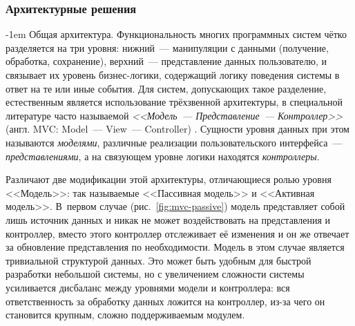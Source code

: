 \documentclass[a4paper, 14pt, titlepage]{extarticle}
\makeatletter
\newcommand{\eng}[1]{\foreignlanguage{english}{#1}}
\newcommand{\term}[1]{\emph{#1}}
\renewcommand{\paragraph}{%
    \@startsection{paragraph}{4}%
    {\parindent}{\z@}{-1em}%
    {\normalfont\normalsize\bfseries}%
  }
\makeatother
\begin{document}
  \subsubsection{Архитектурные решения}

  \paragraph{Общая архитектура.}
  Функциональность многих программных систем чётко разделяется на три уровня: нижний~---
  манипуляции с данными (получение, обработка, сохранение), верхний~--- представление данных
  пользователю, и связывает их уровень бизнес-логики, содержащий логику поведения системы в ответ
  на те или иные события. Для систем, допускающих такое разделение, естественным является
  использование трёхзвенной архитектуры, в специальной литературе часто называемой
  \term{<<Модель~--- Представление~--- Контроллер>>} (англ. \eng{MVC: Model~--- View~--- Controller})
  \cite{gamma-patterns}. Сущности уровня данных при этом называются \term{моделями}, различные
  реализации пользовательского интерфейса~--- \term{представлениями}, а на связующем уровне логики
  находятся \term{контроллеры}.

  Различают две модификации этой архитектуры, отличающиеся ролью уровня <<Модель>>: так называемые
  <<Пассивная модель>> и <<Активная модель>>. В~первом случае (рис.~\ref{fig:mvc-passive}) модель
  представляет собой лишь источник данных и никак не может воздействовать на представления и
  контроллер, вместо этого контроллер отслеживает её изменения и он же отвечает за обновление
  представления по необходимости. Модель в этом случае является тривиальной структурой данных. Это
  может быть удобным для быстрой разработки небольшой системы, но с увеличением сложности системы
  усиливается дисбаланс между уровнями модели и контроллера: вся ответственность за обработку данных
  ложится на контроллер, из-за чего он становится крупным, сложно поддерживаемым модулем.
\end{document}
